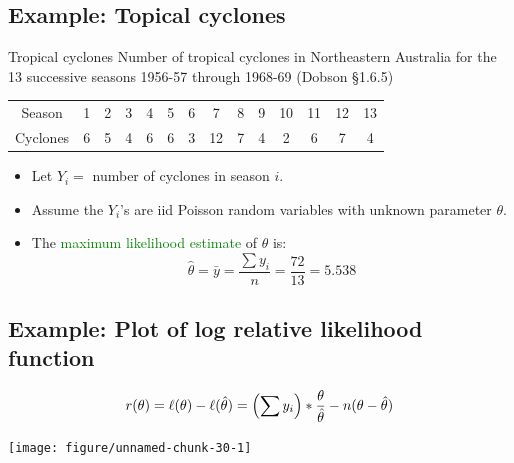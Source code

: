 \documentclass[oneside]{book}\usepackage[]{graphicx}\usepackage[svgnames]{xcolor}
\newenvironment{knitrout}{}{} %
\let\log\relax%
\begin{document}
\subsection*{Example: Topical cyclones}
\begin{Example}{Tropical cyclones}
      Number of tropical cyclones in Northeastern Australia for the 13 successive seasons
      1956-57 through 1968-69 (Dobson §1.6.5)
      \begin{center}
            \begin{NiceTabular}{cccccccccccccc}
                  \toprule
                  Season & 1 & 2 & 3 & 4 & 5 & 6 & 7 & 8 & 9 & 10 & 11 & 12 & 13\\
                  Cyclones  & 6 & 5 & 4 & 6 & 6 & 3 & 12 & 7 & 4 & 2 & 6 & 7 & 4\\
                  \bottomrule
            \end{NiceTabular}
      \end{center}
\end{Example}
\begin{itemize}
      \item Let $ Y_i= $ number of cyclones in season $ i $.
      \item Assume the $ Y_i $'s are iid Poisson random variables with unknown parameter $ \theta $.
      \item The \textcolor{Green}{maximum likelihood estimate} of $ \theta $ is:
            \[ \hat{\theta}=\bar{y}=\frac{\sum y_i}{n}=\frac{72}{13} =5.538  \]
\end{itemize}
\subsection*{Example: Plot of log relative likelihood function}
\[ r(\theta)=\ell(\theta)-\ell(\hat{\theta})=\Bigl(\sum y_i\Bigr)\log*{\frac{\theta}{\hat{\theta}}}-n(\theta-\hat{\theta}) \]
\begin{knitrout}
\color{fgcolor}

{\centering \texttt{[image: figure/unnamed-chunk-30-1]} 

}


\end{knitrout}
\end{document}
